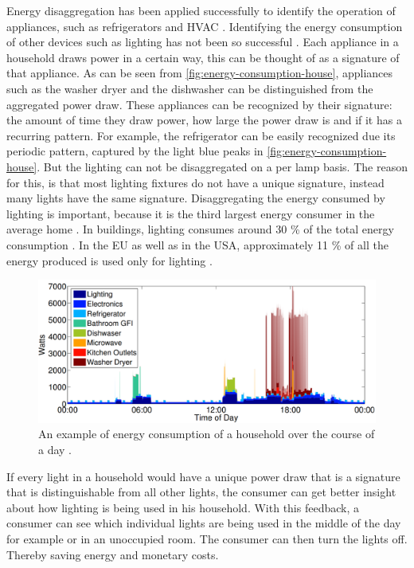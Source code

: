 Energy disaggregation has been applied successfully to identify the operation of appliances, such as refrigerators and HVAC \cite{kolter2011redd} \cite{spiegel2014energy}.
Identifying the energy consumption of other devices such as lighting has not been so successful \cite{spiegel2014energy} \cite{batra2015neighbourhood}.
Each appliance in a household draws power in a certain way, this can be thought of as a signature of that appliance.
As can be seen from \autoref{fig:energy-consumption-house}, appliances such as the washer dryer and the dishwasher can be distinguished from the aggregated power draw.
These appliances can be recognized by their signature: the amount of time they draw power, how large the power draw is and if it has a recurring pattern.
For example, the refrigerator can be easily recognized due its periodic pattern, captured by the light blue peaks in \autoref{fig:energy-consumption-house}.
But the lighting can not be disaggregated on a per lamp basis.
The reason for this, is that most lighting fixtures do not have a unique signature, instead many lights have the same signature.
Disaggregating the energy consumed by lighting is important, because it is the third largest energy consumer in the average home \cite{batra2015neighbourhood}.
In buildings, lighting consumes around 30 \% of the total energy consumption \cite{halonen2010guidebook}.
In the EU as well as in the USA, approximately 11 \% of all the energy produced is used only for lighting \cite{bertoldi2009electricity} \cite{outlook2010energy}.

\begin{figure}[t]
	\centering
	\includegraphics[width=\textwidth]{chapters/introduction-chapters/energy-consumption-house.png}
	\caption{An example of energy consumption of a household over the course of a day \cite{kolter2011redd}.}
	\label{fig:energy-consumption-house}
\end{figure}




If every light in a household would have a unique power draw that is a signature that is distinguishable from all other lights, the consumer can get better insight about how lighting is being used in his household. 
With this feedback, a consumer can see which individual lights are being used in the middle of the day for example or in an unoccupied room.
The consumer can then turn the lights off.
Thereby saving energy and monetary costs.




